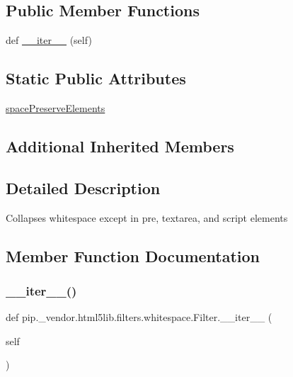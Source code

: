 \subsection*{Public Member Functions}
\begin{DoxyCompactItemize}
\item 
def \hyperlink{classpip_1_1__vendor_1_1html5lib_1_1filters_1_1whitespace_1_1Filter_a80b49946c307c20e4dde79b777036dfb}{\+\_\+\+\_\+iter\+\_\+\+\_\+} (self)
\end{DoxyCompactItemize}
\subsection*{Static Public Attributes}
\begin{DoxyCompactItemize}
\item 
\hyperlink{classpip_1_1__vendor_1_1html5lib_1_1filters_1_1whitespace_1_1Filter_a38cc36f64cb3349554f9aae5fed6f185}{space\+Preserve\+Elements}
\end{DoxyCompactItemize}
\subsection*{Additional Inherited Members}


\subsection{Detailed Description}
\begin{DoxyVerb}Collapses whitespace except in pre, textarea, and script elements\end{DoxyVerb}
 

\subsection{Member Function Documentation}
\mbox{\label{classpip_1_1__vendor_1_1html5lib_1_1filters_1_1whitespace_1_1Filter_a80b49946c307c20e4dde79b777036dfb}} 
\subsubsection{\texorpdfstring{\+\_\+\+\_\+iter\+\_\+\+\_\+()}{\_\_iter\_\_()}}
{\footnotesize\ttfamily def pip.\+\_\+vendor.\+html5lib.\+filters.\+whitespace.\+Filter.\+\_\+\+\_\+iter\+\_\+\+\_\+ (\begin{DoxyParamCaption}\item[{}]{self }\end{DoxyParamCaption})}



